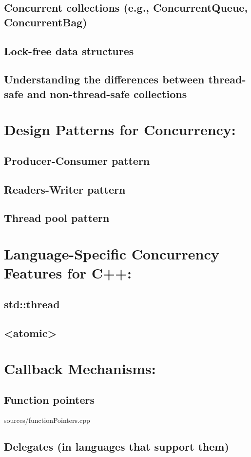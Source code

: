 \documentclass{article}
\begin{document}
    \subsection{ Concurrent collections (e.g., ConcurrentQueue, ConcurrentBag)}
    \subsection{ Lock-free data structures}
    \subsection{ Understanding the differences between thread-safe and non-thread-safe collections}
\section{Design Patterns for Concurrency:}
    \subsection{ Producer-Consumer pattern}
    \subsection{ Readers-Writer pattern}
    \subsection{ Thread pool pattern}
\section{Language-Specific Concurrency Features for C++:}
    \subsection{ std::thread}
    \subsection{ <atomic>}
\section{Callback Mechanisms:}
    \subsection{ Function pointers}
       {sources/functionPointers.cpp}
    \subsection{ Delegates (in languages that support them)}
\end{document}
